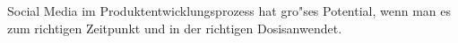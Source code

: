 Social Media im Produktentwicklungsprozess hat gro"ses Potential, wenn man es zum richtigen Zeitpunkt und in der richtigen \glqq Dosis\grqq anwendet.
